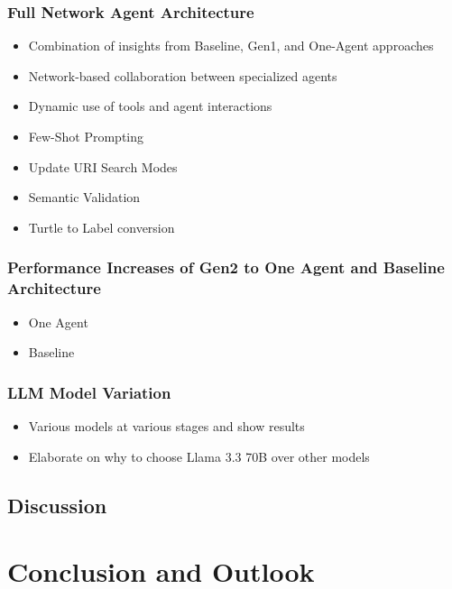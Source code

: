 \documentclass[a4paper,oneside,bibliography=totoc]{scrbook}
\begin{document}
\subsection{Full Network Agent Architecture}
\label{subsec:full_network_agent_architecture}
\begin{itemize}
  \item Combination of insights from Baseline, Gen1, and One-Agent approaches
  \item Network-based collaboration between specialized agents
  \item Dynamic use of tools and agent interactions
  \item Few-Shot Prompting
  \item Update URI Search Modes
  \item Semantic Validation
  \item Turtle to Label conversion
\end{itemize}

\subsection{Performance Increases of Gen2 to One Agent and Baseline Architecture}
\label{subsec:performance_increases_gen2}
\begin{itemize}
  \item One Agent
  \item Baseline
\end{itemize}

\subsection{LLM Model Variation}
\label{subsec:llm_model_variation}
\begin{itemize}
  \item Various models at various stages and show results
  \item Elaborate on why to choose Llama 3.3 70B over other models
\end{itemize}

\section{Discussion}
\label{sec:discussion}


\chapter{Conclusion and Outlook}
\label{ch:conclusion_outlook}
\end{document}
